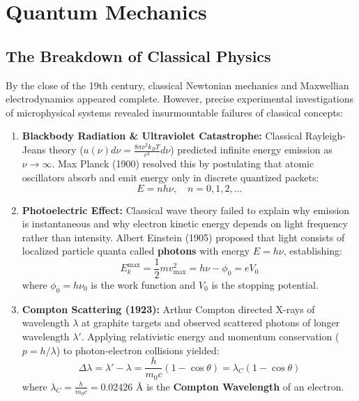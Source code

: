 \chapter{Quantum Mechanics}

\section{The Breakdown of Classical Physics}
By the close of the 19th century, classical Newtonian mechanics and Maxwellian electrodynamics appeared complete. However, precise experimental investigations of microphysical systems revealed insurmountable failures of classical concepts:
\begin{enumerate}[leftmargin=*,itemsep=3pt]
    \item \textbf{Blackbody Radiation \& Ultraviolet Catastrophe:} Classical Rayleigh-Jeans theory ($u(\nu)d\nu = \frac{8\pi\nu^2 k_B T}{c^3}d\nu$) predicted infinite energy emission as $\nu \to \infty$. Max Planck (1900) resolved this by postulating that atomic oscillators absorb and emit energy only in discrete quantized packets:
    \begin{equation}
    E = n h \nu, \quad n = 0, 1, 2, \dots
    \end{equation}
    \item \textbf{Photoelectric Effect:} Classical wave theory failed to explain why emission is instantaneous and why electron kinetic energy depends on light frequency rather than intensity. Albert Einstein (1905) proposed that light consists of localized particle quanta called \textbf{photons} with energy $E = h\nu$, establishing:
    \begin{equation}
    E_k^{\text{max}} = \frac{1}{2}m v_{\text{max}}^2 = h\nu - \phi_0 = e V_0
    \end{equation}
    where $\phi_0 = h\nu_0$ is the work function and $V_0$ is the stopping potential.
    \item \textbf{Compton Scattering (1923):} Arthur Compton directed X-rays of wavelength $\lambda$ at graphite targets and observed scattered photons of longer wavelength $\lambda'$. Applying relativistic energy and momentum conservation ($p = h/\lambda$) to photon-electron collisions yielded:
    \begin{equation}
    \Delta\lambda = \lambda' - \lambda = \frac{h}{m_0 c}(1 - \cos\theta) = \lambda_C (1 - \cos\theta)
    \end{equation}
    where $\lambda_C = \frac{h}{m_0 c} = 0.02426\text{ \AA}$ is the \textbf{Compton Wavelength} of an electron.
\end{enumerate}

